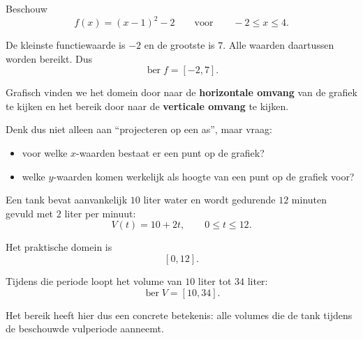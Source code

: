 \documentclass{ximera}
\begin{document}
\begin{voorbeeld}

Beschouw
\[
f(x)=(x-1)^2-2
\qquad\text{voor}\qquad -2\leq x\leq4.
\]

\begin{center}
\end{center}

De kleinste functiewaarde is \(-2\) en de grootste is \(7\). Alle waarden
daartussen worden bereikt. Dus
\[
\boxed{\operatorname{ber}f=[-2,7].}
\]
\end{voorbeeld}

\begin{opmerking}
Grafisch vinden we het domein door naar de \textbf{horizontale omvang}
van de grafiek te kijken en het bereik door naar de \textbf{verticale omvang}
te kijken.

Denk dus niet alleen aan ``projecteren op een as'', maar vraag:
\begin{itemize}
    \item voor welke \(x\)-waarden bestaat er een punt op de grafiek?
    \item welke \(y\)-waarden komen werkelijk als hoogte van een punt op de grafiek voor?
\end{itemize}
\end{opmerking}

\begin{voorbeeld}

Een tank bevat aanvankelijk \(10\) liter water en wordt gedurende \(12\) minuten
gevuld met \(2\) liter per minuut:
\[
V(t)=10+2t,\qquad 0\leq t\leq12.
\]

Het praktische domein is
\[
[0,12].
\]

Tijdens die periode loopt het volume van \(10\) liter tot \(34\) liter:
\[
\boxed{\operatorname{ber}V=[10,34].}
\]

Het bereik heeft hier dus een concrete betekenis: alle volumes die de tank
tijdens de beschouwde vulperiode aanneemt.
\end{voorbeeld}
\end{document}
